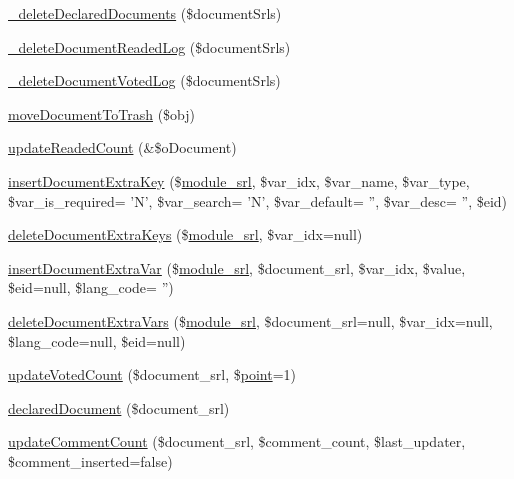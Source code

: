 \begin{DoxyCompactItemize}
\item 
\hyperlink{classdocumentController_a2514acfe313b7ddd5daccb50557d38b5}{\+\_\+delete\+Declared\+Documents} (\$document\+Srls)
\item 
\hyperlink{classdocumentController_ac055fa2cc48de200d0b319eddd7a13da}{\+\_\+delete\+Document\+Readed\+Log} (\$document\+Srls)
\item 
\hyperlink{classdocumentController_a9fe391d1b1ece3b7b16d15976c1622d0}{\+\_\+delete\+Document\+Voted\+Log} (\$document\+Srls)
\item 
\hyperlink{classdocumentController_a3f861f8df6113ca3211c48be3c49f305}{move\+Document\+To\+Trash} (\$obj)
\item 
\hyperlink{classdocumentController_a437461a6588e59e038ed54316bfa7893}{update\+Readed\+Count} (\&\$o\+Document)
\item 
\hyperlink{classdocumentController_a832207dfbf4dac2f32d4a365f9e5ea77}{insert\+Document\+Extra\+Key} (\$\hyperlink{ko_8install_8php_a370bb6450fab1da3e0ed9f484a38b761}{module\+\_\+srl}, \$var\+\_\+idx, \$var\+\_\+name, \$var\+\_\+type, \$var\+\_\+is\+\_\+required= 'N', \$var\+\_\+search= 'N', \$var\+\_\+default= '', \$var\+\_\+desc= '', \$eid)
\item 
\hyperlink{classdocumentController_a279894a3cef824bc940cda67ced511aa}{delete\+Document\+Extra\+Keys} (\$\hyperlink{ko_8install_8php_a370bb6450fab1da3e0ed9f484a38b761}{module\+\_\+srl}, \$var\+\_\+idx=null)
\item 
\hyperlink{classdocumentController_adb5345b43e9795d7e647754cb88b9b5a}{insert\+Document\+Extra\+Var} (\$\hyperlink{ko_8install_8php_a370bb6450fab1da3e0ed9f484a38b761}{module\+\_\+srl}, \$document\+\_\+srl, \$var\+\_\+idx, \$value, \$eid=null, \$lang\+\_\+code= '')
\item 
\hyperlink{classdocumentController_a1ebb5684cf99ea4044fa476c6d006bd2}{delete\+Document\+Extra\+Vars} (\$\hyperlink{ko_8install_8php_a370bb6450fab1da3e0ed9f484a38b761}{module\+\_\+srl}, \$document\+\_\+srl=null, \$var\+\_\+idx=null, \$lang\+\_\+code=null, \$eid=null)
\item 
\hyperlink{classdocumentController_aca82ae9abe825d3ee6182d3608e71e31}{update\+Voted\+Count} (\$document\+\_\+srl, \$\hyperlink{classpoint}{point}=1)
\item 
\hyperlink{classdocumentController_aa2cdd129c5f882d535e39728761d4168}{declared\+Document} (\$document\+\_\+srl)
\item 
\hyperlink{classdocumentController_a1813c01d82596b3ddb48c1bde746428e}{update\+Comment\+Count} (\$document\+\_\+srl, \$comment\+\_\+count, \$last\+\_\+updater, \$comment\+\_\+inserted=false)

\end{DoxyCompactItemize}
